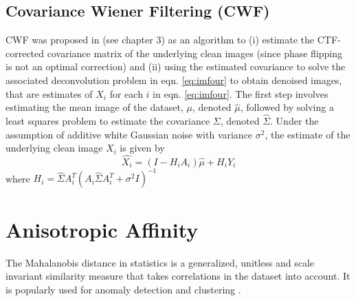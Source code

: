 \subsection{Covariance Wiener Filtering (CWF)}
CWF was proposed in \cite{Bhamre2016} (see chapter 3) as an algorithm to (i) estimate the CTF-corrected covariance matrix of the underlying clean images (since phase flipping is not an optimal correction)  and (ii) using the estimated covariance to solve the associated deconvolution problem in eqn. \ref{eq:imfour} to obtain denoised images, that are estimates of $X_i$ for each $i$ in 
eqn. \ref{eq:imfour}. The first step involves estimating the mean image of the dataset, $\mu$, denoted $\hat{\mu}$, followed by solving a least squares problem to estimate the covariance $\Sigma$, denoted $\hat{\Sigma}$. Under the assumption of additive white Gaussian noise with variance $\sigma^2$, the estimate of the underlying clean image $X_i$ is given by
\begin{equation}
\hat{X_i}=(I-H_iA_i)\hat{\mu} + H_iY_i
\end{equation}
where $H_i=\hat{\Sigma}A_i^T(A_i \hat{\Sigma}A_i^T + \sigma^2 I)^{-1}$
%
\section{Anisotropic Affinity}
The Mahalanobis distance in statistics \cite{mah} is a generalized, unitless and scale invariant similarity measure that takes correlations in the dataset into account. It is popularly used for anomaly detection and clustering \cite{mahclust1, mahclust2}.
 
